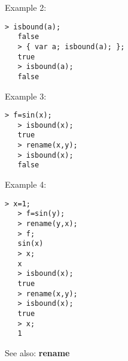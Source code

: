 \noindent Example 2: 
\begin{center}\begin{minipage}{14.8cm}\begin{Verbatim}[frame=single]
   > isbound(a);
   false
   > { var a; isbound(a); };
   true
   > isbound(a);
   false
\end{Verbatim}
\end{minipage}\end{center}
\noindent Example 3: 
\begin{center}\begin{minipage}{14.8cm}\begin{Verbatim}[frame=single]
   > f=sin(x);
   > isbound(x);
   true
   > rename(x,y);
   > isbound(x);
   false
\end{Verbatim}
\end{minipage}\end{center}
\noindent Example 4: 
\begin{center}\begin{minipage}{14.8cm}\begin{Verbatim}[frame=single]
   > x=1;
   > f=sin(y);
   > rename(y,x);
   > f;
   sin(x)
   > x;
   x
   > isbound(x);
   true
   > rename(x,y);
   > isbound(x);
   true
   > x;
   1
\end{Verbatim}
\end{minipage}\end{center}
See also: \textbf{rename}
